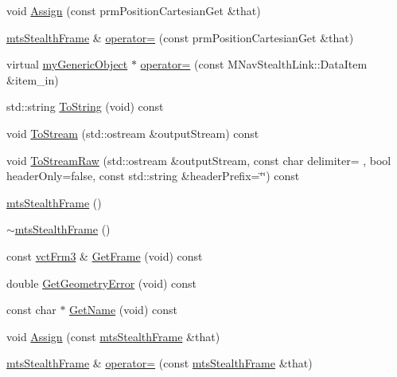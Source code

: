 \begin{DoxyCompactItemize}
void \hyperlink{classmts_stealth_frame_ae570300bb135a8e9ab81d81e5456c552}{Assign} (const prm\+Position\+Cartesian\+Get \&that)
\item 
\hyperlink{classmts_stealth_frame}{mts\+Stealth\+Frame} \& \hyperlink{classmts_stealth_frame_a8350558bec876d3c65c609aecf3e2512}{operator=} (const prm\+Position\+Cartesian\+Get \&that)
\item 
virtual \hyperlink{classmy_generic_object}{my\+Generic\+Object} $\ast$ \hyperlink{classmts_stealth_frame_abcc4616c433c7c6fa4c3fa419c909e28}{operator=} (const M\+Nav\+Stealth\+Link\+::\+Data\+Item \&item\+\_\+in)
\item 
std\+::string \hyperlink{classmts_stealth_frame_a04cfb56c66017fc8029c81ac91655e26}{To\+String} (void) const 
\item 
void \hyperlink{classmts_stealth_frame_ac6f6690c08ffaaad27f589a7dae4da28}{To\+Stream} (std\+::ostream \&output\+Stream) const 
\item 
void \hyperlink{classmts_stealth_frame_a0b6205e28c29ccc0ba25c553bea02419}{To\+Stream\+Raw} (std\+::ostream \&output\+Stream, const char delimiter= \textquotesingle{} \textquotesingle{}, bool header\+Only=false, const std\+::string \&header\+Prefix=\char`\"{}\char`\"{}) const 
\item 
\hyperlink{classmts_stealth_frame_af32afe61af4982beef829344c6b96aea}{mts\+Stealth\+Frame} ()
\item 
\hyperlink{classmts_stealth_frame_a2ddd4401f06f843058dbfe2042dc2788}{$\sim$mts\+Stealth\+Frame} ()
\item 
const \hyperlink{vct_transformation_types_8h_a81feda0a02c2d1bc26e5553f409fed20}{vct\+Frm3} \& \hyperlink{classmts_stealth_frame_a9834fbe11a6dc5971a25d3a892620e89}{Get\+Frame} (void) const 
\item 
double \hyperlink{classmts_stealth_frame_a20ebeeaf561c90fb0be2924c02b230e3}{Get\+Geometry\+Error} (void) const 
\item 
const char $\ast$ \hyperlink{classmts_stealth_frame_ab2bdd6399b97c6558824f1feebdba73c}{Get\+Name} (void) const 
\item 
void \hyperlink{classmts_stealth_frame_a1c6b3490139cd399ae5c350cb97f8955}{Assign} (const \hyperlink{classmts_stealth_frame}{mts\+Stealth\+Frame} \&that)
\item 
\hyperlink{classmts_stealth_frame}{mts\+Stealth\+Frame} \& \hyperlink{classmts_stealth_frame_af158556b959ea14edbd87519613df304}{operator=} (const \hyperlink{classmts_stealth_frame}{mts\+Stealth\+Frame} \&that)
\item 

\end{DoxyCompactItemize}

